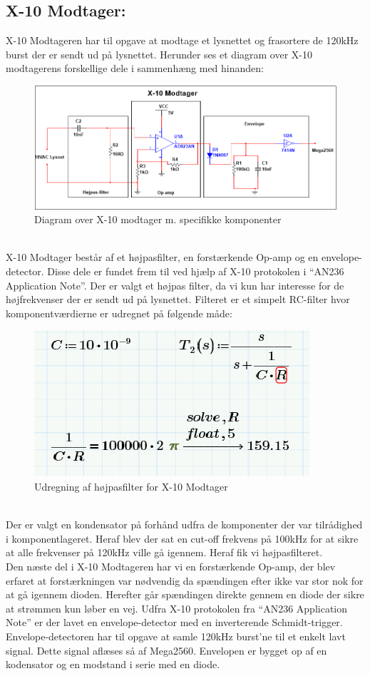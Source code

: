 \documentclass[11pt]{article}
\begin{document}
\subsection{X-10 Modtager: }
X-10 Modtageren har til opgave at modtage et lysnettet og frasortere de 120kHz burst der er sendt ud på lysnettet. Herunder ses et diagram over X-10 modtagerens forskellige dele i sammenhæng med hinanden:
\begin{figure}[!h]
\centering
\includegraphics[scale = 0.7]{X-10modtager}
\caption{Diagram over X-10 modtager m. specifikke komponenter}
\end{figure}\\
X-10 Modtager består af et højpasfilter, en forstærkende Op-amp og en envelope-detector. Disse dele er fundet frem til ved hjælp af X-10 protokolen i ``AN236 Application Note''. Der er valgt et højpas filter, da vi kun har interesse for de højfrekvenser der er sendt ud på lysnettet. Filteret er et simpelt RC-filter hvor komponentværdierne er udregnet på følgende måde:
\begin{figure}[!h]
\centering
\includegraphics[scale = 0.8]{Hojspas-modtager}
\caption{Udregning af højpasfilter for X-10 Modtager}
\end{figure}\\
Der er valgt en kondensator på forhånd udfra de komponenter der var tilrådighed i komponentlageret. Heraf blev der sat en cut-off frekvens på 100kHz for at sikre at alle frekvenser på 120kHz ville gå igennem. Heraf fik vi højpasfilteret. \\
Den næste del i X-10 Modtageren har vi en forstærkende Op-amp, der blev erfaret at forstærkningen var nødvendig da spændingen efter ikke var stor nok for at gå igennem dioden. Herefter går spændingen direkte gennem en diode der sikre at strømmen kun løber en vej. Udfra X-10 protokolen fra ``AN236 Application Note'' er der lavet en envelope-detector med en inverterende Schmidt-trigger. Envelope-detectoren har til opgave at samle 120kHz burst'ne til et enkelt lavt signal. Dette signal aflæses så af Mega2560. Envelopen er bygget op af en kodensator og en modstand i serie med en diode. 
\end{document}
